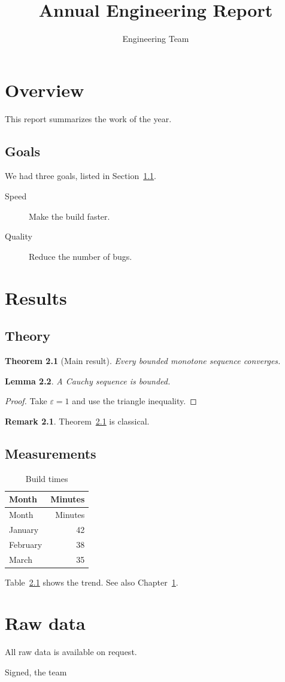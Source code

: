 \documentclass{report}
\title{Annual Engineering Report}
\author{Engineering Team}
\newtheorem{theorem}{Theorem}[chapter]
\newtheorem{lemma}[theorem]{Lemma}
\theoremstyle{definition}
\newtheorem*{remark}{Remark}
\begin{document}
\maketitle
\tableofcontents

\chapter{Overview}\label{ch:overview}
This report summarizes the work of the year.

\section{Goals}\label{sec:goals}
We had three goals, listed in Section~\ref{sec:goals}.

\begin{description}
  \item[Speed] Make the build faster.
  \item[Quality] Reduce the number of bugs.
\end{description}

\chapter{Results}
\section{Theory}
\begin{theorem}[Main result]\label{thm:main}
Every bounded monotone sequence converges.
\end{theorem}
\begin{lemma}
A Cauchy sequence is bounded.
\end{lemma}
\begin{proof}
Take $\varepsilon = 1$ and use the triangle inequality.
\end{proof}
\begin{remark}
Theorem~\ref{thm:main} is classical.
\end{remark}

\section{Measurements}
\begin{longtable}{|l|r|}
\caption{Build times}\label{tab:build}\\
\hline
Month & Minutes \\
\hline
\endfirsthead
\hline
Month & Minutes \\
\hline
\endhead
\hline
\endfoot
January & 42 \\
February & 38 \\
March & 35 \\
\end{longtable}

Table~\ref{tab:build} shows the trend. See also Chapter~\ref{ch:overview}.

\appendix
\chapter{Raw data}
\begin{center}
All raw data is available on request.
\end{center}
\newpage
\begin{flushright}
Signed, the team
\end{flushright}
\end{document}
